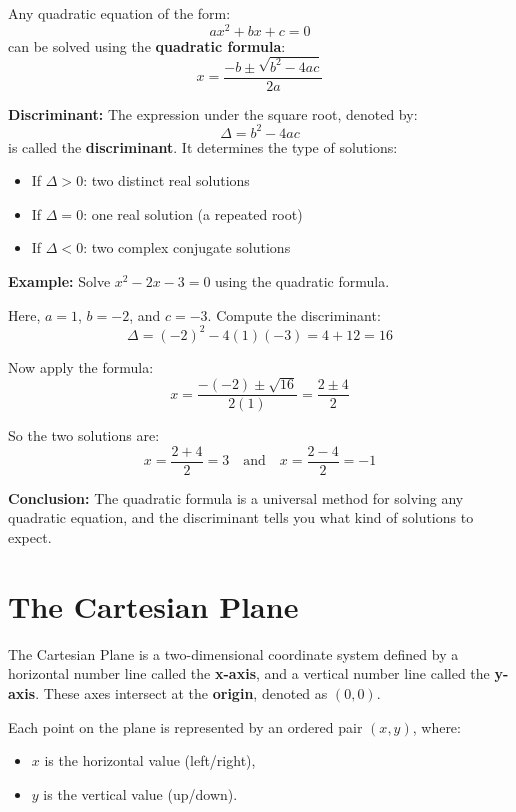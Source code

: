 \documentclass[11pt]{article}
\begin{document}
Any quadratic equation of the form:
\[
ax^2 + bx + c = 0
\]
can be solved using the \textbf{quadratic formula}:
\[
x = \frac{-b \pm \sqrt{b^2 - 4ac}}{2a}
\]

\bigskip

\textbf{Discriminant:}
The expression under the square root, denoted by:
\[
\Delta = b^2 - 4ac
\]
is called the \textbf{discriminant}. It determines the type of solutions:

\begin{tcolorbox}[title=Discriminant Summary, colback=yellow!5!white, colframe=yellow!80!black]
\begin{itemize}
  \item If \( \Delta > 0 \): two distinct real solutions
  \item If \( \Delta = 0 \): one real solution (a repeated root)
  \item If \( \Delta < 0 \): two complex conjugate solutions
\end{itemize}
\end{tcolorbox}

\bigskip

\textbf{Example:}
Solve \( x^2 - 2x - 3 = 0 \) using the quadratic formula.

Here, \(a = 1\), \(b = -2\), and \(c = -3\).
Compute the discriminant:
\[
\Delta = (-2)^2 - 4(1)(-3) = 4 + 12 = 16
\]

Now apply the formula:
\[
x = \frac{-(-2) \pm \sqrt{16}}{2(1)} = \frac{2 \pm 4}{2}
\]

So the two solutions are:
\[
x = \frac{2 + 4}{2} = 3 \quad \text{and} \quad x = \frac{2 - 4}{2} = -1
\]

\bigskip

\textbf{Conclusion:}
The quadratic formula is a universal method for solving any quadratic equation, and the discriminant tells you what kind of solutions to expect.
\section{The Cartesian Plane}

The Cartesian Plane is a two-dimensional coordinate system defined by a horizontal number line called the \textbf{x-axis}, and a vertical number line called the \textbf{y-axis}. These axes intersect at the \textbf{origin}, denoted as \( (0, 0) \).

Each point on the plane is represented by an ordered pair \( (x, y) \), where:
\begin{itemize}
  \item \( x \) is the horizontal value (left/right),
  \item \( y \) is the vertical value (up/down).
\end{itemize}
\end{document}
